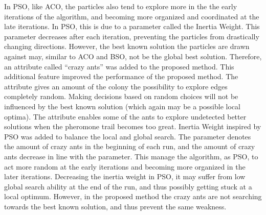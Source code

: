 In PSO, like ACO, the particles also tend to explore more in the the early iterations of the algorithm, and becoming more organized and coordinated at the late iterations. In PSO, this is due to a parameter called the Inertia Weight. This parameter decreases after each iteration, preventing the particles from drastically changing directions. However, the best known solution the particles are drawn against may, similar to ACO and BSO, not be the global best solution. Therefore, an attribute called ``crazy ants'' was added to the proposed method. This additional feature improved the performance of the proposed method. The attribute gives an amount of the colony the possibility to explore edges completely random. Making decisions based on random choices will not be influenced by the best known solution (which again may be a possible local optima). The attribute enables some of the ants to explore undetected better solutions when the pheromone trail becomes too great. Inertia Weight inspired by PSO was added to balance the local and global search. The parameter denotes the amount of crazy ants in the beginning of each run, and the amount of crazy ants decrease in line with the parameter. This manage the algorithm, as PSO, to act more random at the early iterations and becoming more organized in the later iterations. Decreasing the inertia weight in PSO, it may suffer from low global search ability at the end of the run, and thus possibly getting stuck at a local optimum. However, in the proposed method the crazy ants are not searching towards the best known solution, and thus prevent the same weakness.




